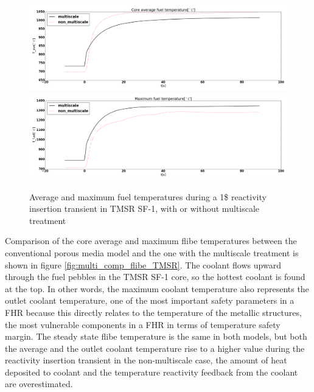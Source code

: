 \documentclass{elsarticle}
\begin{document}
\begin{figure}
    \centering
    \includegraphics[width=\textwidth]{images/diffusion/tmsr/RI/compare_multiscale/T_fuel_ave.png}
    \includegraphics[width=\textwidth]{images/diffusion/tmsr/RI/compare_multiscale/T_fuel_max.png}
    \caption{Average and maximum fuel temperatures during a 1\$ reactivity insertion transient in TMSR SF-1, with or without multiscale treatment}
    \label{fig:multi_comp_fuel_TMSR}
\end{figure}

Comparison of the core average and maximum flibe temperatures between the conventional porous media model and the one with the multiscale treatment is shown in figure \ref{fig:multi_comp_flibe_TMSR}. 
The coolant flows upward through the fuel pebbles in the TMSR SF-1 core, so the hottest coolant is found at the top. In other words, the maximum coolant temperature also represents the outlet coolant temperature, one of the most important safety parameters in a FHR because this directly relates to the temperature of the metallic structures, the most vulnerable components in a FHR in terms of temperature safety margin.
The steady state flibe temperature is the same in both models, but both the average and the outlet coolant temperature rise to a higher value during the reactivity insertion transient in the non-multiscale case, the amount of heat deposited to coolant and the temperature reactivity feedback from the coolant are overestimated. 
\end{document}
